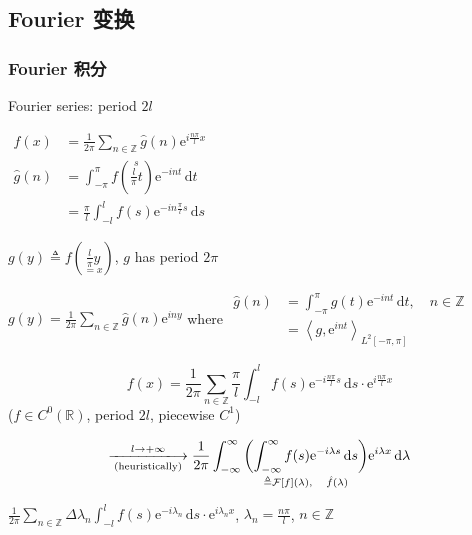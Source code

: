 \subsection{Fourier 变换}
\subsubsection{Fourier 积分}

Fourier series: period $2l$

$\begin{aligned}
        f(x)       & =\frac{1}{2\pi}\sum_{n\in\mathbb{Z}}\hat{g}(n)\mathrm{e}^{i\frac{n\pi}{l}x}               \\
        \hat{g}(n) & =\int_{-\pi}^{\pi}f\left(\overset{s}{\frac{l}{\pi}t}\right)\mathrm{e}^{-int}\,\mathrm{d}t \\
                   & =\frac{\pi}{l}\int_{-l}^l f(s)\mathrm{e}^{-in\frac{\pi}{l}s}\,\mathrm{d}s
    \end{aligned}$

$g(y)\triangleq f\left(\underset{=x}{\frac{l}{\pi}y}\right)$, $g$ has period $2\pi$

$g(y)=\frac{1}{2\pi}\sum_{n\in\mathbb{Z}}\hat{g}(n)\mathrm{e}^{iny}$ where $\begin{aligned}
        \hat{g}(n) & =\int_{-\pi}^{\pi}g(t)\mathrm{e}^{-int}\,\mathrm{d}t,\quad n\in\mathbb{Z} \\
                   & =\left<g,\mathrm{e}^{int}\right>_{L^2[-\pi,\pi]}
    \end{aligned}$

$$f(x)=\frac{1}{2\pi}\sum_{n\in\mathbb{Z}}\frac{\pi}{l}\int_{-l}^l f(s)\mathrm{e}^{-i\frac{n\pi}{l}s}\,\mathrm{d}s\cdot\mathrm{e}^{i\frac{n\pi}{l}x}$$
($f\in C^0(\mathbb{R})$, period $2l$, piecewise $C^1$)

$$\xlongrightarrow[\text{(heuristically)}]{l\to+\infty}\frac{1}{2\pi}\int_{-\infty}^{\infty}\underset{\triangleq\mathcal{F}[f](\lambda),\quad \hat{f}(\lambda)}{\left(\int_{-\infty}^{\infty}f(s)\mathrm{e}^{-i\lambda s}\,\mathrm{d}s\right)}\mathrm{e}^{i\lambda x}\,\mathrm{d}\lambda$$

$\frac{1}{2\pi}\sum_{n\in\mathbb{Z}}\Delta\lambda_n\int_{-l}^l f(s)\mathrm{e}^{-i\lambda_n}\,\mathrm{d}s\cdot\mathrm{e}^{i\lambda_n x}$, $\lambda_n=\frac{n\pi}{l}$, $n\in\mathbb{Z}$